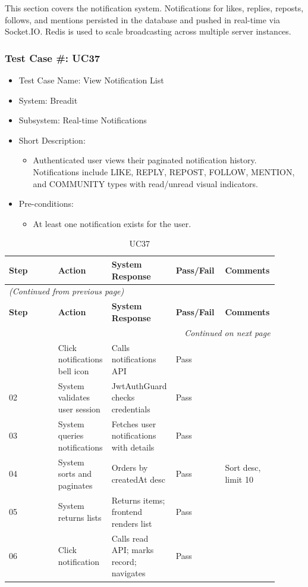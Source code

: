 This section covers the notification system. Notifications for likes, replies, reposts, follows, and mentions persisted in the database and pushed in real-time via Socket.IO. Redis is used to scale broadcasting across multiple server instances.

\subsubsection{Test Case \#: UC37}
\begin{itemize}
  \item Test Case Name: View Notification List
  \item System: Breadit
  \item Subsystem: Real-time Notifications
  \item Short Description:
\begin{itemize}
  \item Authenticated user views their paginated notification history. Notifications include LIKE, REPLY, REPOST, FOLLOW, MENTION, and COMMUNITY types with read/unread visual indicators.
\end{itemize}
  \item Pre-conditions:
\begin{itemize}
  \item At least one notification exists for the user.
\end{itemize}
\end{itemize}

\begin{longtable}{|p{0.18\linewidth}|p{0.18\linewidth}|p{0.18\linewidth}|p{0.18\linewidth}|p{0.18\linewidth}|}
\caption{UC37} \label{tab:41} \\
\hline
\textbf{Step} & \textbf{Action} & \textbf{System Response} & \textbf{Pass/Fail} & \textbf{Comments} \\
\hline
\endfirsthead
\multicolumn{5}{l}{\textit{(Continued from previous page)}} \\
\hline
\textbf{Step} & \textbf{Action} & \textbf{System Response} & \textbf{Pass/Fail} & \textbf{Comments} \\
\hline
\endhead
\hline \multicolumn{5}{r}{\textit{Continued on next page}} \\
\endfoot
\hline
\endlastfoot
01 & Click notifications bell icon & Calls notifications API & Pass &  \\
\hline
02 & System validates user session & JwtAuthGuard checks credentials & Pass &  \\
\hline
03 & System queries notifications & Fetches user notifications with details & Pass &  \\
\hline
04 & System sorts and paginates & Orders by createdAt desc & Pass & Sort desc, limit 10 \\
\hline
05 & System returns lists & Returns items; frontend renders list & Pass &  \\
\hline
06 & Click notification & Calls read API; marks record; navigates & Pass &  \\
\hline
\end{longtable}


